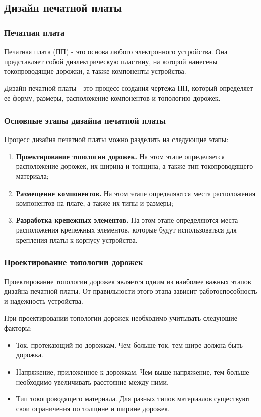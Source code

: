\subsection{Дизайн печатной платы}

\subsubsection{Печатная плата}

Печатная плата (ПП) - это основа любого электронного устройства. Она представляет собой диэлектрическую пластину, на которой нанесены токопроводящие дорожки, а также компоненты устройства.

Дизайн печатной платы - это процесс создания чертежа ПП, который определяет ее форму, размеры, расположение компонентов и топологию дорожек.

\subsubsection{Основные этапы дизайна печатной платы}
Процесс дизайна печатной платы можно разделить на следующие этапы:
\begin{enumerate}
    \item \textbf{Проектирование топологии дорожек.} На этом этапе определяется расположение дорожек, их ширина и толщина, а также тип токопроводящего материала;
    \item \textbf{Размещение компонентов.} На этом этапе определяются места расположения компонентов на плате, а также их типы и размеры;
    \item \textbf{Разработка крепежных элементов.} На этом этапе определяются места расположения крепежных элементов, которые будут использоваться для крепления платы к корпусу устройства.
\end{enumerate}

\subsubsection{Проектирование топологии дорожек}
Проектирование топологии дорожек является одним из наиболее важных этапов дизайна печатной платы. От правильности этого этапа зависит работоспособность и надежность устройства.

При проектировании топологии дорожек необходимо учитывать следующие факторы:
\begin{itemize}
    \item Ток, протекающий по дорожкам. Чем больше ток, тем шире должна быть дорожка.
    \item Напряжение, приложенное к дорожкам. Чем выше напряжение, тем больше необходимо увеличивать расстояние между ними.
    \item Тип токопроводящего материала. Для разных типов материалов существуют свои ограничения по толщине и ширине дорожек.
\end{itemize}
    
